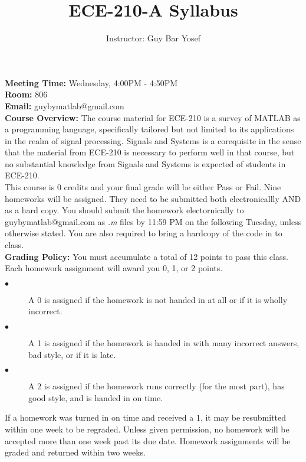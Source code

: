 \documentclass[12pt]{article}
\begin{document}

\title{ECE-210-A Syllabus}
\date{}
\author{Instructor: Guy Bar Yosef}
\maketitle

\textbf{Meeting Time:} Wednesday, 4:00PM - 4:50PM \\
\textbf{Room:} 806 \\
\textbf{Email:} guybymatlab@gmail.com \\

\textbf{Course Overview:}
The course material for ECE-210 is a survey of 
MATLAB as a programming language, specifically tailored but not 
limited to its applications in the realm of signal processing. 
Signals and Systems is a corequisite in the sense that the material 
from ECE-210 is necessary to perform well in that course, but no substantial 
knowledge from Signals and Systems is expected of students in ECE-210. \\
 
This course is 0 credits and your final grade will be either Pass or Fail.
Nine homeworks will be assigned.
They need to be submitted both electronicallly AND as a hard copy.
You should submit the homework electornically to guybymatlab@gmail.com as 
\textit{.m} files by 11:59 PM on the following Tuesday, unless otherwise stated.
You are also required to bring a hardcopy of the code in to class. 
\\

\textbf{Grading Policy:}
You must accumulate a total of 12 points to pass this class.
Each homework assignment will award you 0, 1, or 2 points.
\begin{description}
    \item [$\bullet$]A 0 is assigned if the homework is not handed 
    in at all or if it is wholly incorrect.
    \item [$\bullet$]A 1 is assigned if the homework is handed
    in with many incorrect answers, bad style, or if it is late.
    \item [$\bullet$]A 2 is assigned if the homework runs correctly
    (for the most part), has good style, and is handed in on time.
\end{description} 
If a homework was turned in on time and received a 1,
it may be resubmitted within one week to be regraded.
Unless given permission, no homework will be accepted more than one 
week past its due date. Homework assignments will be graded and 
returned within two weeks. \\
\end{document}
